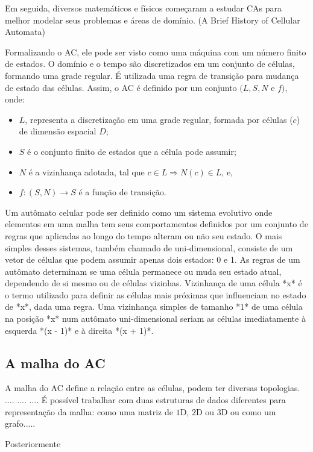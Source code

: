 Em seguida, diversos matemáticos e físicos começaram a estudar CAs para melhor modelar seus problemas e áreas de domínio. (A Brief History of Cellular Automata)


Formalizando o AC, ele pode ser visto como uma máquina com um número finito de estados. O domínio e o tempo são discretizados em um conjunto de células, formando uma grade regular. É utilizada uma regra de transição para mudança de estado das células. Assim, o AC é definido por um conjunto $(L, S, N$ e $f)$, onde:
\begin{itemize}
\item $L$, representa a discretização em uma grade regular, formada por células ($c$) de dimensão espacial $D$;
\item $S$ é o conjunto finito de estados que a célula pode assumir;
\item $N$ é a vizinhança adotada, tal que $c \in L \Rightarrow N(c) \in L$, e,
\item $f:(S,N) \rightarrow S$ é a função de transição.
\end{itemize}

Um autômato celular pode ser definido como um sistema evolutivo onde elementos em uma malha tem seus comportamentos definidos por um conjunto de regras que aplicadas ao longo do tempo alteram ou não seu estado. O mais simples desses sistemas, também chamado de uni-dimensional, consiste de um vetor de células que podem assumir apenas dois estados: 0 e 1. As regras de um autômato determinam se uma célula permanece ou muda seu estado atual, dependendo de si mesmo ou de células vizinhas. Vizinhança de uma célula *x* é o termo utilizado para definir as células mais próximas que influenciam no estado de *x*, dada uma regra. Uma vizinhança simples de tamanho *1* de uma célula na posição *x* num autômato uni-dimensional seriam as células imediatamente à esquerda *(x - 1)* e à direita *(x + 1)*.

\subsection{A malha do AC}
A malha do AC define a relação entre as células, podem ter diversas topologias.
....
....
....
É possível trabalhar com duas estruturas de dados diferentes para representação da malha: como uma matriz de $1$D, $2$D ou $3$D ou como um grafo.....



Posteriormente









